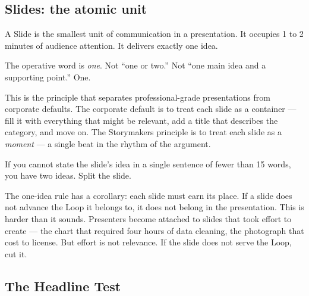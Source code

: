 
\subsection{Slides: the atomic unit}

A Slide is the smallest unit of communication in a presentation. It occupies 1 to 2 minutes of audience attention. It delivers exactly one idea.

The operative word is \emph{one}. Not ``one or two.'' Not ``one main idea and a supporting point.'' One.

This is the principle that separates professional-grade presentations from corporate defaults. The corporate default is to treat each slide as a container --- fill it with everything that might be relevant, add a title that describes the category, and move on. The Storymakers principle is to treat each slide as a \emph{moment} --- a single beat in the rhythm of the argument.

\begin{keybox}
If you cannot state the slide's idea in a single sentence of fewer than 15 words, you have two ideas. Split the slide.
\end{keybox}

The one-idea rule has a corollary: each slide must earn its place. If a slide does not advance the Loop it belongs to, it does not belong in the presentation. This is harder than it sounds. Presenters become attached to slides that took effort to create --- the chart that required four hours of data cleaning, the photograph that cost  to license. But effort is not relevance. If the slide does not serve the Loop, cut it.


\subsection{The Headline Test}

